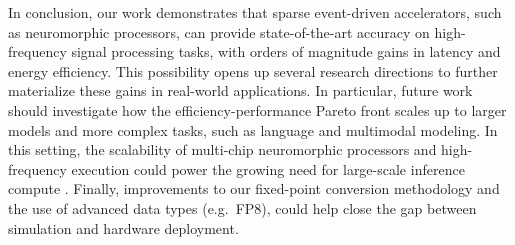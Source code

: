 In conclusion, our work demonstrates that sparse event-driven accelerators, such as neuromorphic processors, can provide state-of-the-art accuracy on high-frequency signal processing tasks, with orders of magnitude gains in latency and energy efficiency.
This possibility opens up several research directions to further materialize these gains in real-world applications.
In particular, future work should investigate how the efficiency-performance Pareto front scales up to larger models and more complex tasks, such as language and multimodal modeling.
In this setting, the scalability of multi-chip neuromorphic processors \cite{kudithipudi_neuromorphic_2025} and high-frequency execution could power the growing need for large-scale inference compute \cite{DBLP:journals/corr/abs-2408-03314}.
Finally, improvements to our fixed-point conversion methodology and the use of advanced data types (e.g.\ FP8), could help close the gap between simulation and hardware deployment.
%
%
